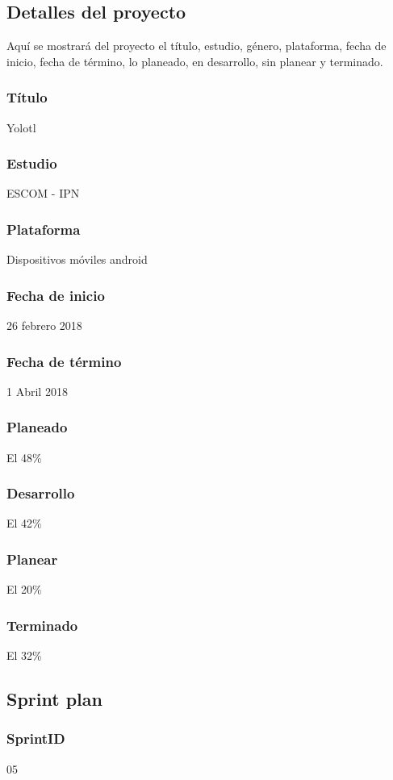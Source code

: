 \subsection{Detalles del proyecto}
Aquí se mostrará del proyecto el título, estudio, género, plataforma, fecha de inicio, fecha de término, lo planeado, en desarrollo, sin planear y terminado.
\\
\subsubsection{Título}
Yolotl

\subsubsection{Estudio}
ESCOM - IPN

\subsubsection{Plataforma}
Dispositivos móviles android

\subsubsection{Fecha de inicio}
26 febrero 2018
\subsubsection{Fecha de término}
1 Abril 2018
\subsubsection{Planeado}
El 48\%
\subsubsection{Desarrollo}
El 42\%
\subsubsection{Planear}
El 20\%
\subsubsection{Terminado}
El 32\%



\subsection{Sprint plan}
\subsubsection{SprintID}
05
